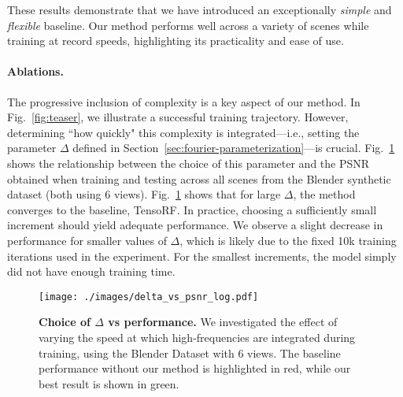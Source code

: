 These results demonstrate that we have introduced an exceptionally \textit{simple} and \textit{flexible} baseline. Our method performs well across a variety of scenes while training at record speeds, highlighting its practicality and ease of use.

\vspace{-1em}\paragraph{Ablations.}


The progressive inclusion of complexity is a key aspect of our method. In Fig.~\ref{fig:teaser}, we illustrate a successful training trajectory. However, determining ``how quickly" this complexity is integrated—i.e., setting the parameter $\Delta$ defined in Section~\ref{sec:fourier-parameterization}—is crucial. Fig.~\ref{fig:delta-vs-performance} shows the relationship between the choice of this parameter and the PSNR obtained when training and testing across all scenes from the Blender synthetic dataset (both using 6 views). Fig.~\ref{fig:delta-vs-performance} shows that for large $\Delta$, the method converges to the baseline, TensoRF. In practice, choosing a sufficiently small increment should yield adequate performance. We observe a slight decrease in performance for smaller values of $\Delta$, which is likely due to the fixed 10k training iterations used in the experiment. For the smallest increments, the model simply did not have enough training time.

\begin{figure}[t]
	\centering
    \vspace{-1em} 
	\texttt{[image: ./images/delta\_vs\_psnr\_log.pdf]}
    \vspace{-2em} %
	\caption{\textbf{Choice of $\Delta$ vs performance.} We investigated the effect of varying the speed at which high-frequencies are integrated during training, using the Blender Dataset with 6 views. The baseline performance without our method is highlighted in red, while our best result is shown in green.}
	\label{fig:delta-vs-performance}
\end{figure}

